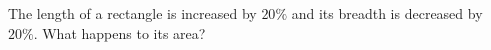 The length of a rectangle is increased by $20\%$ and its breadth is decreased by $20\%$. What happens to its area?
